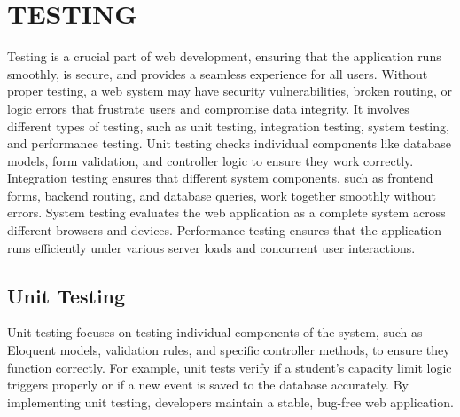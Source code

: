 \chapter{TESTING}
Testing is a crucial part of web development, ensuring that the application runs smoothly, is secure, and provides a seamless experience for all users. Without proper testing, a web system may have security vulnerabilities, broken routing, or logic errors that frustrate users and compromise data integrity. It involves different types of testing, such as unit testing, integration testing, system testing, and performance testing.
\noindent
Unit testing checks individual components like database models, form validation, and controller logic to ensure they work correctly. Integration testing ensures that different system components, such as frontend forms, backend routing, and database queries, work together smoothly without errors. System testing evaluates the web application as a complete system across different browsers and devices. Performance testing ensures that the application runs efficiently under various server loads and concurrent user interactions.

\section{Unit Testing}
Unit testing focuses on testing individual components of the system, such as Eloquent models, validation rules, and specific controller methods, to ensure they function correctly. For example, unit tests verify if a student's capacity limit logic triggers properly or if a new event is saved to the database accurately. By implementing unit testing, developers maintain a stable, bug-free web application.

\renewcommand{\arraystretch}{1.3}


